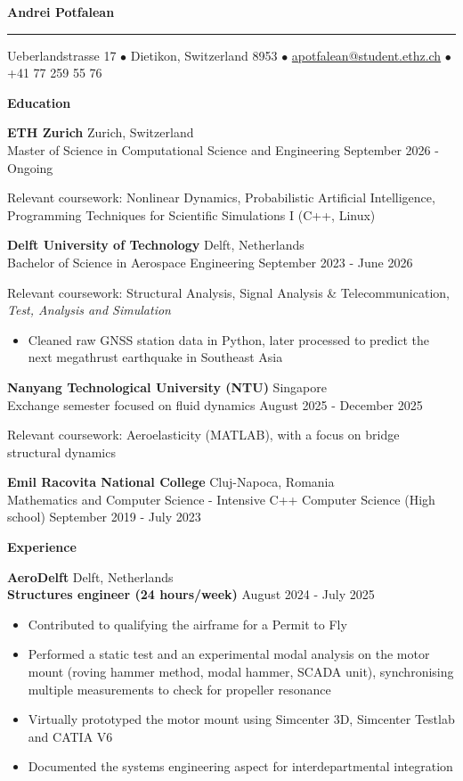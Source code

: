 \documentclass[11pt]{article}
\newcommand{\cvsection}[1]{%
  \vspace{16pt}%
  \centerline{\textbf{#1}}%
  \vspace{8pt}%
}
\newcommand{\cventry}[4]{%
  \textbf{#1} \hfill #2 \\
  #3 \hfill #4\par
}
\newcommand{\cvrole}[4]{%
  \textbf{#1} \hfill #2 \\
  \textbf{#3} \hfill #4\par
}
\newcommand{\cvgap}{\vspace{0.7em}}
\begin{document}
\begin{center}
  {\LARGE\textbf{Andrei Potfalean}}
\end{center}
\vspace{0.8pt}
\hrule
\vspace{18pt}
\centerline{Ueberlandstrasse 17 $\bullet$ Dietikon, Switzerland 8953 $\bullet$
  \href{mailto:apotfalean@student.ethz.ch}{apotfalean@student.ethz.ch} $\bullet$ +41 77 259 55 76}

\cvsection{Education}

\cventry{ETH Zurich}{Zurich, Switzerland}
  {Master of Science in Computational Science and Engineering}{September 2026 - Ongoing}
Relevant coursework: Nonlinear Dynamics, Probabilistic Artificial Intelligence, Programming Techniques for Scientific Simulations I (C++, Linux)
\cvgap

\cventry{Delft University of Technology}{Delft, Netherlands}
  {Bachelor of Science in Aerospace Engineering}{September 2023 - June 2026}
Relevant coursework: Structural Analysis, Signal Analysis \& Telecommunication, \textit{Test, Analysis and Simulation}
\begin{itemize}
  \item Cleaned raw GNSS station data in Python, later processed to predict the next megathrust earthquake in Southeast Asia
\end{itemize}
\cvgap

\cventry{Nanyang Technological University (NTU)}{Singapore}
  {Exchange semester focused on fluid dynamics}{August 2025 - December 2025}
Relevant coursework: Aeroelasticity (MATLAB), with a focus on bridge structural dynamics
\cvgap

\cventry{Emil Racovita National College}{Cluj-Napoca, Romania}
  {Mathematics and Computer Science - Intensive C++ Computer Science (High school)}{September 2019 - July 2023}

\cvsection{Experience}

\cvrole{AeroDelft}{Delft, Netherlands}{Structures engineer (24 hours/week)}{August 2024 - July 2025}
\begin{itemize}
  \item Contributed to qualifying the airframe for a Permit to Fly
  \item Performed a static test and an experimental modal analysis on the motor mount (roving hammer method, modal hammer, SCADA unit), synchronising multiple measurements to check for propeller resonance
  \item Virtually prototyped the motor mount using Simcenter 3D, Simcenter Testlab and CATIA V6
  \item Documented the systems engineering aspect for interdepartmental integration
\end{itemize}
\cvgap
\end{document}
